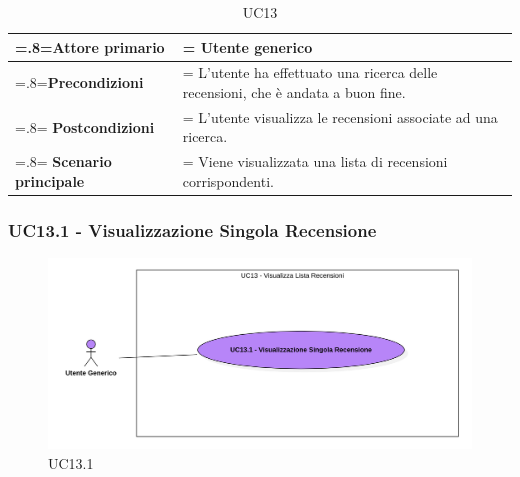             \begin{table}[H]
                \centering
                \renewcommand{\arraystretch}{1.8}
                \renewcommand\tabularxcolumn[1]{m{#1}}
                \begin{tabularx}{0.9\textwidth} {
                    >{\hsize=.8\hsize\linewidth=\hsize}X
                    >{\hsize=1.2\hsize\linewidth=\hsize}X}
                    \hline
                    \textbf{Attore primario} & Utente generico \\
                    \hline
                    \textbf{Precondizioni} & L'utente ha effettuato una ricerca delle recensioni, che è andata a buon fine. \\
                    \hline
                    \textbf{Postcondizioni} & L'utente visualizza le recensioni associate ad una ricerca. \\
                    \hline
                    \textbf{Scenario principale} & Viene visualizzata una lista di recensioni corrispondenti. \\
                    \hline
                \end{tabularx}
                \caption{UC13}
            \end{table}

        \subsubsection{UC13.1 - Visualizzazione Singola Recensione}
        \label{UC13.1}

            \begin{figure}[H]
                \centering
                \includegraphics[scale=0.6]{src/img/UC13.1.png}
                \caption{UC13.1}
            \end{figure}

